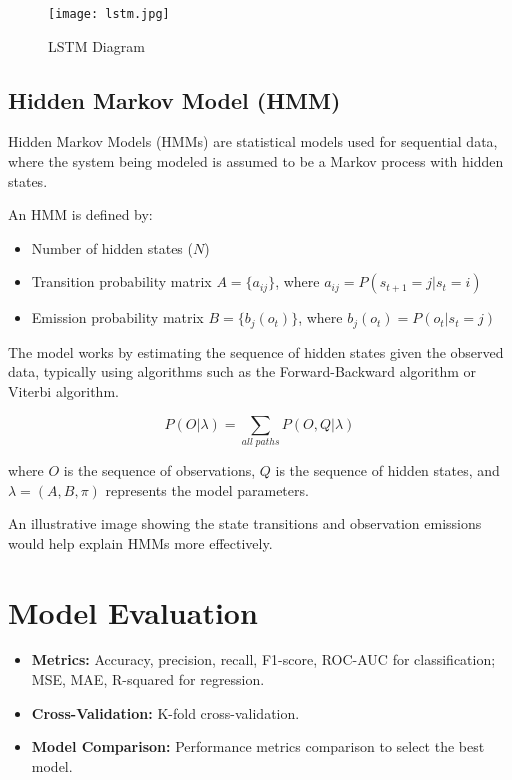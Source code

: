 \begin{figure}[h]
    \centering
    \texttt{[image: lstm.jpg]}
    \caption{LSTM Diagram}
    \label{fig:example-image}
\end{figure}



\subsection{Hidden Markov Model (HMM)}

Hidden Markov Models (HMMs) are statistical models used for sequential data, where the system being modeled is assumed to be a Markov process with hidden states.

An HMM is defined by:
\begin{itemize}
    \item Number of hidden states ($N$)
    \item Transition probability matrix $A = \{a_{ij}\}$, where $a_{ij} = P(s_{t+1}=j | s_t=i)$
    \item Emission probability matrix $B = \{b_j(o_t)\}$, where $b_j(o_t) = P(o_t | s_t=j)$
\end{itemize}

The model works by estimating the sequence of hidden states given the observed data, typically using algorithms such as the Forward-Backward algorithm or Viterbi algorithm.

\[
P(O | \lambda) = \sum_{all \; paths} P(O, Q | \lambda)
\]

where $O$ is the sequence of observations, $Q$ is the sequence of hidden states, and $\lambda = (A, B, \pi)$ represents the model parameters.

An illustrative image showing the state transitions and observation emissions would help explain HMMs more effectively.


\section{Model Evaluation}
\begin{itemize}
    \item \textbf{Metrics:} Accuracy, precision, recall, F1-score, ROC-AUC for classification; MSE, MAE, R-squared for regression.
    \item \textbf{Cross-Validation:} K-fold cross-validation.
    \item \textbf{Model Comparison:} Performance metrics comparison to select the best model.
\end{itemize}
